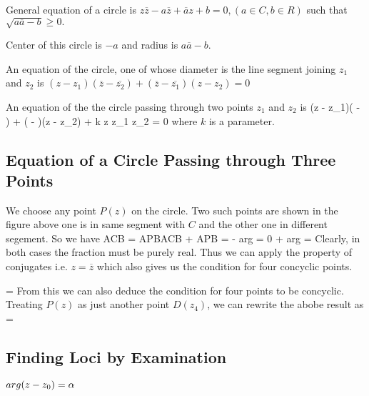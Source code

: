 \noindent General equation of a circle is $z\overline{z} - a\overline{z} + \overline{a}z + b = 0, (a\in C, b\in R)$ such that $\sqrt{a\overline{a} - b}\geq 0.$

\noindent Center of this circle is $-a$ and radius is $a\overline{a} - b.$

\noindent An equation of the circle, one of whose diameter is the line segment joining $z_1$ and $z_2$ is $(z - z_1)(\overline{z} - \overline{z_2}) + (\overline{z} - \overline{z_1})(z - z_2) = 0$

\noindent An equation of the the circle passing through two points $z_1$ and $z_2$ is
\startformula (z - z_1)( - ) + ( - )(z - z_2) + k \startdeterminant \NC z \NC {} \NR\NC z_1
  \NC {} \NR\NC z_2 \NC {}  \NR\stopdeterminant = 0\stopformula
where $k$ is a parameter.

\subsection{Equation of a Circle Passing through Three Points}

\startplacefigure[title={Circle through three points}]
\stopplacefigure

We choose any point $P(z)$ on the circle. Two such points are shown in the figure above one is in same segment with $C$
and the other one in different segement. So we have
\startformula \angle ACB = \angle APB\angle ACB + \angle APB = \pi\stopformula
\startformula \arg{} - arg = 0\arg{} + arg = \pi\stopformula
Clearly, in both cases the fraction must be purely real. Thus we can apply the property of conjugates i.e. $z = \overline{z}$ which
also gives us the condition for four concyclic points.

\startformula \Rightarrow {} = \stopformula
From this we can also deduce the condition for four points to be concyclic. Treating $P(z)$ as just another point $D(z_4)$, we can
rewrite the abobe result as
\startformula {} = \stopformula

\subsection{Finding Loci by Examination}
\startitemize[n]
\item $\\arg(z - z_0) = \alpha$

